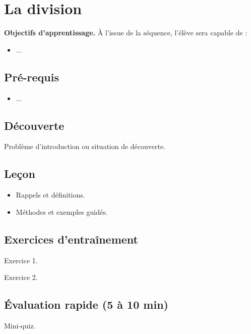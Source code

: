 \chapter{La division}
\label{chap:seq10}

\begin{definitionbox}
\textbf{Objectifs d'apprentissage.} À l'issue de la séquence, l'élève sera capable de :
\begin{itemize}
  \item ...
\end{itemize}
\end{definitionbox}

\section*{Pré-requis}
\begin{itemize}
  \item ...
\end{itemize}

\section{Découverte}
\begin{examplebox}
Problème d'introduction ou situation de découverte.
\end{examplebox}

\section{Leçon}
\begin{itemize}
  \item Rappels et définitions.
  \item Méthodes et exemples guidés.
\end{itemize}

\section{Exercices d'entraînement}
\begin{exercisebox}
Exercice 1.
\end{exercisebox}

\begin{exercisebox}
Exercice 2.
\end{exercisebox}

\section{Évaluation rapide (5 à 10 min)}
\begin{exercisebox}
Mini-quiz.
\end{exercisebox}
